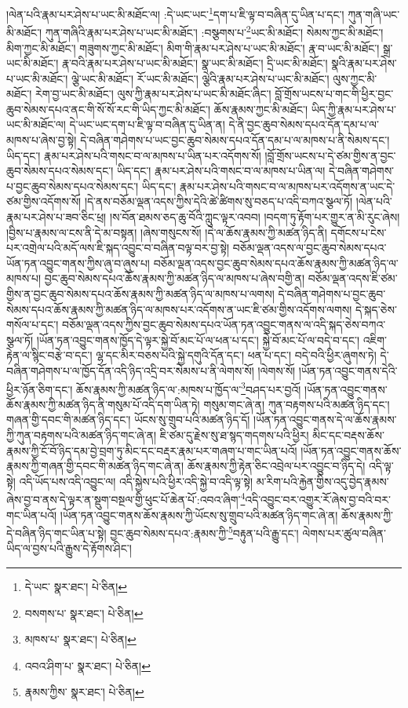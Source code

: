 །ལེན་པའི་རྣམ་པར་ཤེས་པ་ཡང་མི་མཐོང་ལ། :དེ་ཡང་ཡང་\footnote{དེ་ཡང་  སྣར་ཐང་།  པེ་ཅིན། }དག་པ་ཇི་ལྟ་བ་བཞིན་དུ་ཡིན་པ་དང་། ཀུན་གཞི་ཡང་མི་མཐོང་། ཀུན་གཞིའི་རྣམ་པར་ཤེས་པ་ཡང་མི་མཐོང་། :བསྩགས་པ་\footnote{བསགས་པ་  སྣར་ཐང་།  པེ་ཅིན། }ཡང་མི་མཐོང་། སེམས་ཀྱང་མི་མཐོང་། མིག་ཀྱང་མི་མཐོང་། གཟུགས་ཀྱང་མི་མཐོང་། མིག་གི་རྣམ་པར་ཤེས་པ་ཡང་མི་མཐོང་། རྣ་བ་ཡང་མི་མཐོང་། སྒྲ་ཡང་མི་མཐོང་། རྣ་བའི་རྣམ་པར་ཤེས་པ་ཡང་མི་མཐོང་། སྣ་ཡང་མི་མཐོང་། དྲི་ཡང་མི་མཐོང་། སྣའི་རྣམ་པར་ཤེས་པ་ཡང་མི་མཐོང་། ལྕེ་ཡང་མི་མཐོང་། རོ་ཡང་མི་མཐོང་། ལྕེའི་རྣམ་པར་ཤེས་པ་ཡང་མི་མཐོང་། ལུས་ཀྱང་མི་མཐོང་། རེག་བྱ་ཡང་མི་མཐོང་། ལུས་ཀྱི་རྣམ་པར་ཤེས་པ་ཡང་མི་མཐོང་ཞིང་། བློ་གྲོས་ཡངས་པ་གང་གི་ཕྱིར་བྱང་ཆུབ་སེམས་དཔའ་ནང་གི་སོ་སོ་རང་གི་ཡིད་ཀྱང་མི་མཐོང་། ཆོས་རྣམས་ཀྱང་མི་མཐོང་། ཡིད་ཀྱི་རྣམ་པར་ཤེས་པ་ཡང་མི་མཐོང་ལ། དེ་ཡང་ཡང་དག་པ་ཇི་ལྟ་བ་བཞིན་དུ་ཡིན་ན། དེ་ནི་བྱང་ཆུབ་སེམས་དཔའ་དོན་དམ་པ་ལ་མཁས་པ་ཞེས་བྱ་སྟེ། དེ་བཞིན་གཤེགས་པ་ཡང་བྱང་ཆུབ་སེམས་དཔའ་དོན་དམ་པ་ལ་མཁས་པ་ནི་སེམས་དང་། ཡིད་དང་། རྣམ་པར་ཤེས་པའི་གསང་བ་ལ་མཁས་པ་ཡིན་པར་འདོགས་སོ། །བློ་གྲོས་ཡངས་པ་དེ་ཙམ་གྱིས་ན་བྱང་ཆུབ་སེམས་དཔའ་སེམས་དང་། ཡིད་དང་། རྣམ་པར་ཤེས་པའི་གསང་བ་ལ་མཁས་པ་ཡིན་ལ། དེ་བཞིན་གཤེགས་པ་བྱང་ཆུབ་སེམས་དཔའ་སེམས་དང་། ཡིད་དང་། རྣམ་པར་ཤེས་པའི་གསང་བ་ལ་མཁས་པར་འདོགས་ན་ཡང་དེ་ཙམ་གྱིས་འདོགས་སོ། །དེ་ནས་བཅོམ་ལྡན་འདས་ཀྱིས་དེའི་ཚེ་ཚིགས་སུ་བཅད་པ་འདི་བཀའ་སྩལ་ཏོ། །ལེན་པའི་རྣམ་པར་ཤེས་པ་ཟབ་ཅིང་ཕྲ། །ས་བོན་ཐམས་ཅད་ཆུ་བོའི་ཀླུང་ལྟར་འབབ། །བདག་ཏུ་རྟོག་པར་གྱུར་ན་མི་རུང་ཞེས། །བྱིས་པ་རྣམས་ལ་ངས་ནི་དེ་མ་བསྟན། །ཞེས་གསུངས་སོ། །དེ་ལ་ཆོས་རྣམས་ཀྱི་མཚན་ཉིད་ནི། དགོངས་པ་ངེས་པར་འགྲེལ་པའི་མདོ་ལས་ཇི་སྐད་འབྱུང་བ་བཞིན་བལྟ་བར་བྱ་སྟེ། བཅོམ་ལྡན་འདས་ལ་བྱང་ཆུབ་སེམས་དཔའ་ཡོན་ཏན་འབྱུང་གནས་ཀྱིས་ཞུ་བ་ཞུས་པ། བཅོམ་ལྡན་འདས་བྱང་ཆུབ་སེམས་དཔའ་ཆོས་རྣམས་ཀྱི་མཚན་ཉིད་ལ་མཁས་པ། བྱང་ཆུབ་སེམས་དཔའ་ཆོས་རྣམས་ཀྱི་མཚན་ཉིད་ལ་མཁས་པ་ཞེས་བགྱི་ན། བཅོམ་ལྡན་འདས་ཇི་ཙམ་གྱིས་ན་བྱང་ཆུབ་སེམས་དཔའ་ཆོས་རྣམས་ཀྱི་མཚན་ཉིད་ལ་མཁས་པ་ལགས། དེ་བཞིན་གཤེགས་པ་བྱང་ཆུབ་སེམས་དཔའ་ཆོས་རྣམས་ཀྱི་མཚན་ཉིད་ལ་མཁས་པར་འདོགས་ན་ཡང་ཇི་ཙམ་གྱིས་འདོགས་ལགས། དེ་སྐད་ཅེས་གསོལ་པ་དང་། བཅོམ་ལྡན་འདས་ཀྱིས་བྱང་ཆུབ་སེམས་དཔའ་ཡོན་ཏན་འབྱུང་གནས་ལ་འདི་སྐད་ཅེས་བཀའ་སྩལ་ཏོ། །ཡོན་ཏན་འབྱུང་གནས་ཁྱོད་དེ་ལྟར་སྐྱེ་བོ་མང་པོ་ལ་ཕན་པ་དང་། སྐྱེ་བོ་མང་པོ་ལ་བདེ་བ་དང་། འཇིག་རྟེན་ལ་སྙིང་བརྩེ་བ་དང་། ལྷ་དང་མིར་བཅས་པའི་སྐྱེ་དགུའི་དོན་དང་། ཕན་པ་དང་། བདེ་བའི་ཕྱིར་ཞུགས་ཏེ། དེ་བཞིན་གཤེགས་པ་ལ་ཁྱོད་དོན་འདི་ཉིད་འདྲི་བར་སེམས་པ་ནི་ལེགས་སོ། །ལེགས་སོ། །ཡོན་ཏན་འབྱུང་གནས་དེའི་ཕྱིར་ཉོན་ཅིག་དང་། ཆོས་རྣམས་ཀྱི་མཚན་ཉིད་ལ་:མཁས་པ་ཁྱོད་ལ་\footnote{མཁས་པ་  སྣར་ཐང་།  པེ་ཅིན། }བཤད་པར་བྱའོ། །ཡོན་ཏན་འབྱུང་གནས་ཆོས་རྣམས་ཀྱི་མཚན་ཉིད་ནི་གསུམ་པོ་འདི་དག་ཡིན་ཏེ། གསུམ་གང་ཞེ་ན། ཀུན་བརྟགས་པའི་མཚན་ཉིད་དང་། གཞན་གྱི་དབང་གི་མཚན་ཉིད་དང་། ཡོངས་སུ་གྲུབ་པའི་མཚན་ཉིད་དོ། །ཡོན་ཏན་འབྱུང་གནས་དེ་ལ་ཆོས་རྣམས་ཀྱི་ཀུན་བརྟགས་པའི་མཚན་ཉིད་གང་ཞེ་ན། ཇི་ཙམ་དུ་རྗེས་སུ་ཐ་སྙད་གདགས་པའི་ཕྱིར། མིང་དང་བརྡས་ཆོས་རྣམས་ཀྱི་ངོ་བོ་ཉིད་དམ་བྱེ་བྲག་ཏུ་མིང་དང་བརྡར་རྣམ་པར་གཞག་པ་གང་ཡིན་པའོ། །ཡོན་ཏན་འབྱུང་གནས་ཆོས་རྣམས་ཀྱི་གཞན་གྱི་དབང་གི་མཚན་ཉིད་གང་ཞེ་ན། ཆོས་རྣམས་ཀྱི་རྟེན་ཅིང་འབྲེལ་པར་འབྱུང་བ་ཉིད་དེ། འདི་ལྟ་སྟེ། འདི་ཡོད་པས་འདི་འབྱུང་ལ། འདི་སྐྱེས་པའི་ཕྱིར་འདི་སྐྱེ་བ་འདི་ལྟ་སྟེ། མ་རིག་པའི་རྐྱེན་གྱིས་འདུ་བྱེད་རྣམས་ཞེས་བྱ་བ་ནས་དེ་ལྟར་ན་སྡུག་བསྔལ་གྱི་ཕུང་པོ་ཆེན་པོ་:འབའ་ཞིག་\footnote{འབའ་ཤིག་པ་  སྣར་ཐང་།  པེ་ཅིན། }འདི་འབྱུང་བར་འགྱུར་རོ་ཞེས་བྱ་བའི་བར་གང་ཡིན་པའོ། །ཡོན་ཏན་འབྱུང་གནས་ཆོས་རྣམས་ཀྱི་ཡོངས་སུ་གྲུབ་པའི་མཚན་ཉིད་གང་ཞེ་ན། ཆོས་རྣམས་ཀྱི་དེ་བཞིན་ཉིད་གང་ཡིན་པ་སྟེ། བྱང་ཆུབ་སེམས་དཔའ་:རྣམས་ཀྱི་\footnote{རྣམས་ཀྱིས་  སྣར་ཐང་།  པེ་ཅིན། }བརྟུན་པའི་རྒྱུ་དང་། ལེགས་པར་ཚུལ་བཞིན་ཡིད་ལ་བྱས་པའི་རྒྱུས་དེ་རྟོགས་ཤིང་། 